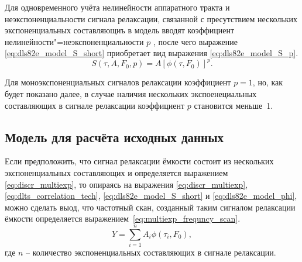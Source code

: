     Для одновременного учёта нелинейности аппаратного тракта и 
    неэкспоненциальности сигнала релаксации, связанной с пресутствием 
    нескольких экспоненциальных составляющиъ в модель вводят коэффициент
    нелинейности"=неэкспоненциальности $p$ \cite{rp_vak}, после чего 
    выражение \ref{eq:dls82e_model_S_short} приобретает вид выражения 
    \ref{eq:dls82e_model_S_p}.
    \begin{equation}
        \label{eq:dls82e_model_S_p}
        S(\tau,A,F_0,p) = A\left[\phi(\tau, F_0)\right]^p.
    \end{equation}

    Для моноэкспоненциальных сигналов релаксации коэффициент $p=1$, но,
    как будет показано далее, в случае наличия нескольких экспоенециальных
    составляющих в сигнале релаксации коэффициент $p$ становится меньше~1.


    \subsection{Модель для расчёта исходных данных}
    Если предположить, что сигнал релаксации ёмкости состоит из нескольких
    экспоненциальных составляющих и определяется выражением
    \ref{eq:discr_multiexp}, то опираясь на выражения
    \ref{eq:discr_multiexp}, \ref{eq:dlts_correlation_tech}, 
    \ref{eq:dls82e_model_S_short} и \ref{eq:dls82e_model_phi}, можно
    сделать выод, что частотный скан, созданный таким сигналом релаксации
    ёмкости определяется выражением~\ref{eq:multiexp_frequncy_scan}.
    \begin{equation}
        \label{eq:multiexp_frequncy_scan}
        Y = \sum_{i=1}^{n} A_i \phi(\tau_i, F_0) ,
    \end{equation}
    где $n$ -- количество экспоненциальных составляющих в сигнале 
    релаксации.